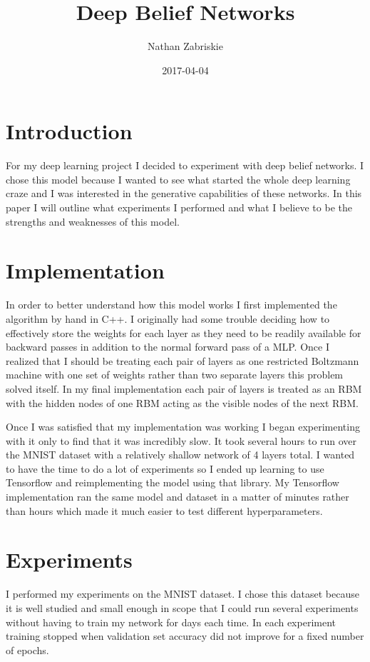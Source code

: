 \documentclass{article}
\title{Deep Belief Networks}
\date{2017-04-04}
\author{Nathan Zabriskie}
\begin{document}
	
	\maketitle
	
	\section{Introduction}
	For my deep learning project I decided to experiment with deep belief networks. I chose this model because I wanted to see what started the whole deep learning craze and I was interested in the generative capabilities of these networks. In this paper I will outline what experiments I performed and what I believe to be the strengths and weaknesses of this model.
	
	\section{Implementation}
	In order to better understand how this model works I first implemented the algorithm by hand in C++. I originally had some trouble deciding how to effectively store the weights for each layer as they need to be readily available for backward passes in addition to the normal forward pass of a MLP. Once I realized that I should be treating each pair of layers as one restricted Boltzmann machine with one set of weights rather than two separate layers this problem solved itself. In my final implementation each pair of layers is treated as an RBM with the hidden nodes of one RBM acting as the visible nodes of the next RBM.
	
	 Once I was satisfied that my implementation was working I began experimenting with it only to find that it was incredibly slow. It took several hours to run over the MNIST dataset with a relatively shallow network of 4 layers total. I wanted to have the time to do a lot of experiments so I ended up learning to use Tensorflow and reimplementing the model using that library. My Tensorflow implementation ran the same model and dataset in a matter of minutes rather than hours which made it much easier to test different hyperparameters. 
	
	\section{Experiments}
	I performed my experiments on the MNIST dataset. I chose this dataset because it is well studied and small enough in scope that I could run several experiments without having to train my network for days each time. In each experiment training stopped when validation set accuracy did not improve for a fixed number of epochs. 
	
\end{document}
